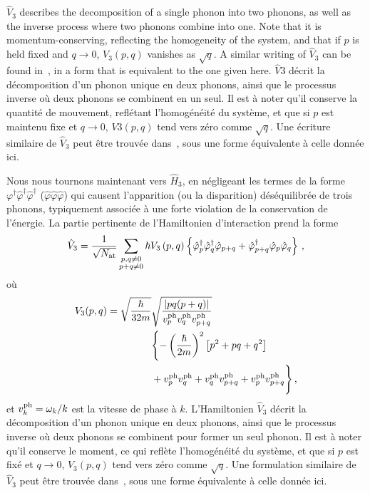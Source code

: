 \documentclass[aps,prd,notitlepage,amsfonts,amssymb,amsmath,nofootinbib,superscriptaddress,longbibliography]{revtex4-2}
\newcommand{\trad}[1]{\textcolor{tradcolor}{#1}}
\newcommand{\resumefr}[1]{\textcolor{resumecolor}{#1}}
\begin{document}
$\hat{V}_{3}$ describes the decomposition of a single phonon into two phonons, as well as the inverse process where two phonons combine into one. Note that it is momentum-conserving, reflecting the homogeneity of the system, and that if $p$ is held fixed and $q \to 0$, $V_{3}\left(p,q\right)$ vanishes as $\sqrt{q}$.
A similar writing of  $\hat{V}_{3}$ can be found in~\cite{Ristivojevic2016}, in a form that is equivalent to the one given here.
\trad{$\hat{V}{3}$ décrit la décomposition d'un phonon unique en deux phonons, ainsi que le processus inverse où deux phonons se combinent en un seul. Il est à noter qu'il conserve la quantité de mouvement, reflétant l'homogénéité du système, et que si $p$ est maintenu fixe et $q \to 0$, $V{3}\left(p,q\right)$ tend vers zéro comme $\sqrt{q}$. 
Une écriture similaire de $\hat{V}_{3}$ peut être trouvée dans~\cite{Ristivojevic2016}, sous une forme équivalente à celle donnée ici.}

\resumefr{
Nous nous tournons maintenant vers $\hat{H}_{3}$, en négligeant les termes de la forme $\varphi^{\dagger}\hat{\varphi}^{\dagger}\hat{\varphi}^{\dagger}$ ($\hat{\varphi}\hat{\varphi}\hat{\varphi}$) qui causent l'apparition (ou la disparition) déséquilibrée de trois phonons, typiquement associée à une forte violation de la conservation de l'énergie. La partie pertinente de l'Hamiltonien d'interaction prend la forme
\begin{equation*}
    \hat{V}_{3} = \frac{1}{\sqrt{N_{\rm at}}} \sum_{\substack{p,q \neq 0 \\ p+q \neq 0}} \hbar V_3\left(p,q\right) \left\{ \hat{\varphi}^{\dagger}_{p} \hat{\varphi}^{\dagger}_{q} \hat{\varphi}_{p+q} + \hat{\varphi}_{p+q}^{\dagger} \hat{\varphi}_{p}\hat{\varphi}_{q} \right\} \, ,
\end{equation*}
où
\begin{align}
\begin{split}
\label{def:V3_on_shell}
V_3 (p,q) = \sqrt{ \frac{\hbar}{32 m  } }  & \sqrt{\frac{ \left| p q (p+q) \right| }{v^{\rm ph}_p v^{\rm ph}_q v^{\rm ph}_{p+q}}} \\
& \Biggl\{ -\left(\frac{\hbar}{2m}\right)^{2} \left[ p^{2} + p q  + q^{2} \right] \\
& + v^{\rm ph}_p v^{\rm ph}_q + v^{\rm ph}_q v^{\rm ph}_{p+q} + v^{\rm ph}_p v^{\rm ph}_{p+q}  \Biggr\} \, ,
\end{split}
\end{align}
et $v^{\rm ph}_k = \omega_{k}/k$ est la vitesse de phase à $k$.
L'Hamiltonien $\hat{V}_{3}$ décrit la décomposition d'un phonon unique en deux phonons, ainsi que le processus inverse où deux phonons se combinent pour former un seul phonon. Il est à noter qu'il conserve le moment, ce qui reflète l'homogénéité du système, et que si $p$ est fixé et $q \to 0$, $V_{3}\left(p,q\right)$ tend vers zéro comme $\sqrt{q}$. Une formulation similaire de $\hat{V}_{3}$ peut être trouvée dans~\cite{Ristivojevic2016}, sous une forme équivalente à celle donnée ici.
}
\end{document}

